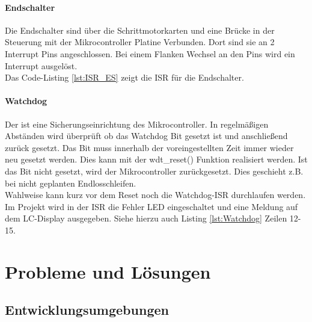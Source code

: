 \subsubsection{Endschalter}
\label{sec:Endschalter_SW}
Die Endschalter sind über die Schrittmotorkarten und eine Brücke in der Steuerung mit der Mikrocontroller Platine Verbunden. Dort sind sie an 2 Interrupt Pins angeschlossen.  Bei einem Flanken Wechsel an den Pins wird ein Interrupt ausgelöst. \\
Das Code-Listing \ref{lst:ISR_ES} zeigt die ISR für die Endschalter.
\lstset{language=C, basicstyle=\footnotesize, showstringspaces=false, tabsize=2}

\subsubsection{Watchdog}
Der  ist eine Sicherungseinrichtung des Mikrocontroller. In regelmäßigen Abständen wird überprüft ob das Watchdog Bit gesetzt ist und anschließend zurück gesetzt. Das Bit muss innerhalb der voreingestellten Zeit immer wieder neu gesetzt werden. Dies kann mit der wdt\_reset() Funktion realisiert werden. Ist das Bit nicht gesetzt, wird der Mikrocontroller zurückgesetzt.  Dies geschieht z.B. bei nicht geplanten Endlosschleifen.\\
Wahlweise kann kurz vor dem Reset noch die Watchdog-ISR durchlaufen werden.\\
Im Projekt wird in der ISR die Fehler LED eingeschaltet und eine Meldung auf dem LC-Display ausgegeben. Siehe hierzu auch Listing \ref{lst:Watchdog} Zeilen 12-15.
\lstset{language=C, basicstyle=\footnotesize, showstringspaces=false, tabsize=4}




\chapter{Probleme und Lösungen}
\section{Entwicklungsumgebungen}

